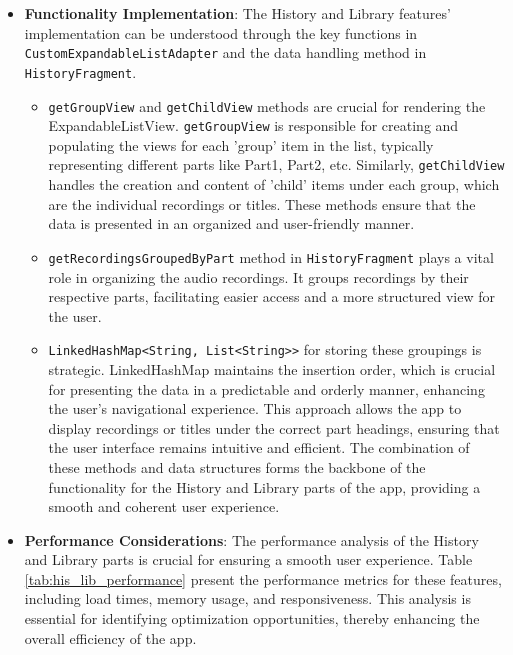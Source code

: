 \documentclass[conference,10pt,letterpaper]{IEEEtran}
\begin{document}
\begin{itemize}
		\item \textbf{Functionality Implementation}: 
		The History and Library features' implementation can be understood through the key functions in \texttt{CustomExpandableListAdapter} and the data handling method in \texttt{HistoryFragment}.
		
		\begin{itemize}
			\item \texttt{getGroupView} and \texttt{getChildView} methods are crucial for rendering the ExpandableListView. \texttt{getGroupView} is responsible for creating and populating the views for each 'group' item in the list, typically representing different parts like Part1, Part2, etc. Similarly, \texttt{getChildView} handles the creation and content of 'child' items under each group, which are the individual recordings or titles. These methods ensure that the data is presented in an organized and user-friendly manner. 
			
			\newpage
			\item \texttt{getRecordingsGroupedByPart} method in \texttt{HistoryFragment} plays a vital role in organizing the audio recordings. It groups recordings by their respective parts, facilitating easier access and a more structured view for the user.
			
			\item \texttt{LinkedHashMap<String, List<String>>} for storing these groupings is strategic. LinkedHashMap maintains the insertion order, which is crucial for presenting the data in a predictable and orderly manner, enhancing the user's navigational experience. This approach allows the app to display recordings or titles under the correct part headings, ensuring that the user interface remains intuitive and efficient. The combination of these methods and data structures forms the backbone of the functionality for the History and Library parts of the app, providing a smooth and coherent user experience.
		\end{itemize}
		
		\item \textbf{Performance Considerations}: 
		The performance analysis of the History and Library parts is crucial for ensuring a smooth user experience. Table \ref{tab:his_lib_performance} present the performance metrics for these features, including load times, memory usage, and responsiveness. This analysis is essential for identifying optimization opportunities, thereby enhancing the overall efficiency of the app.
	\end{itemize}
	
\end{document}
